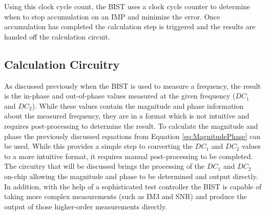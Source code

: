 \documentclass[12pt]{report}
\begin{document}
Using this clock cycle count, the BIST uses a clock cycle counter to determine when to stop accumulation on an IMP and minimize the error.  Once accumulation has completed the calculation step is triggered and the results are handed off the calculation circuit.

\subsection{Calculation Circuitry}
As discussed previously when the BIST is used to measure a frequency, the result is the in-phase and out-of-phase values measured at the given frequency ($DC_1$ and $DC_2$).  While these values contain the magnitude and phase information about the measured frequency, they are in a format which is not intuitive and requires post-processing to determine the result.  To calculate the magnitude and phase the previously discussed equations from Equation \ref{eq:MagnitudePhase} can be used.  While this provides a simple step to converting the $DC_1$ and $DC_2$ values to a more intuitive format, it requires manual post-processing to be completed.  The circuitry that will be discussed brings the processing of the $DC_1$ and $DC_2$ on-chip allowing the magnitude and phase to be determined and output directly.  In addition, with the help of a sophisticated test controller the BIST is capable of taking more complex measurements (such as IM3 and SNR) and produce the output of those higher-order measurements directly.
\end{document}
